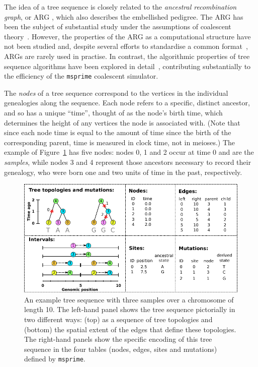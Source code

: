 \documentclass{article}
\newcommand{\msprime}{\texttt{msprime}}
\begin{document}
The idea of a tree sequence is closely related to the \emph{ancestral recombination graph},
or {ARG} \citep{griffiths1991two,griffiths1997ancestral},
which also describes the embellished pedigree.
The ARG has been the subject of substantial study
under the assumptions of coalescent
theory~\citep{wiuf1997number,wiuf1999ancestry,marjoram2006coalescent,wilton2015smc}.
However, the properties of the ARG as a computational structure have not
been studied and, despite several efforts to standardise a common
format~\citep{morin2006netgen,mcgill2013graphml}, %
ARGs are rarely used in practise.
In contrast, the algorithmic properties of tree sequence
algorithms have been explored in detail~\citep{kelleher2016efficient},
contributing substantially to the efficiency of the \msprime{} coalescent simulator.

The \emph{nodes} of a tree sequence
correspond to the vertices in the individual genealogies along the sequence.
Each node refers to a specific, distinct ancestor,
and so has a unique ``time'',
thought of as the node's birth time, which determines the height of any vertices
the node is associated with.
(Note that since each node time is equal to the amount of time since the {birth} of the
corresponding parent, time is measured in clock time, not in meioses.)
The example of Figure~\ref{fig:example_tree_sequence} has five nodes:
nodes 0, 1 and 2 occur at time 0 and are the \emph{samples},
while nodes 3 and 4 represent those ancestors necessary to record their genealogy,
who were born one and two units of time in the past, respectively.

\begin{figure}
    \begin{center}
        \includegraphics[width=\textwidth]{example_tree_sequence}
    \end{center}
    \caption{
        An example tree sequence with three samples over a chromosome of length 10.
        The left-hand panel shows the tree sequence pictorially in two different ways:
        (top) as a sequence of tree topologies
        and (bottom) the spatial extent of the edges that define these topologies.
        The right-hand panels show the specific encoding
        of this tree sequence in the four tables (nodes, edges, sites and mutations)
        defined by \msprime.
        \label{fig:example_tree_sequence}
    }
\end{figure}
\end{document}
